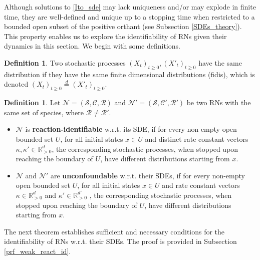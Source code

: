 \documentclass[10pt,a4paper]{amsart}
\theoremstyle{definition}
\newtheorem{definition}[theorem]{Definition}
\theoremstyle{remark}
\theoremstyle{consequence}
\def\k{\kappa}
\def\cN{\mathcal{N}}
\def\cR{\mathcal{R}}
\def\cS{\mathcal{S}}
\def\cC{\mathcal{C}}
\def\R{\mathbb{R}}
\numberwithin{equation}{section}
\begin{document}
Although solutions to \eqref{Ito_sde} may lack uniqueness and/or may explode in finite time, they are well-defined and unique up to a stopping time when restricted to a bounded open subset of the positive orthant (see Subsection \ref{SDEs_theory}).  This property enables us to explore the identifiability of RNs given their dynamics in this section. We begin with some definitions.
 \begin{definition}\label{def_fidis}
     Two stochastic processes $(X_t)_{t\geq0},({X}'_t)_{t\geq0}$ have the same distribution if they have the same finite dimensional distributions (fidis), which is denoted $(X_t)_{t\geq0}\overset{d}{=}({X}'_t)_{t\geq0}$.
 \end{definition}

\begin{definition}
Let $\cN = (\cS, \cC, \cR)$ and $\cN' = (\cS, \cC', \cR')$ be two RNs with the same set of species, where $\cR \neq \cR'$.
\begin{itemize}
  \item  $\cN$ is \textbf{reaction-identifiable} w.r.t. its SDE, if for every non-empty open bounded set $U$, for all initial states $x\in U$ and distinct rate constant vectors $\k, \k'\in\R_{>0}^d$, the corresponding stochastic processes, when stopped upon reaching the boundary of $U$, have different distributions starting from $x$.

  \item   $\cN$ and $\cN'$ are \textbf{unconfoundable} w.r.t. their SDEs, if for every non-empty open bounded set $U$, for all initial states $x\in U$ and rate constant vectors $\k\in \R_{>0}^d$ and $\k'\in \R_{>0}^{d'}$ , the corresponding stochastic processes, when stopped upon reaching the boundary of $U$, have different distributions starting from $x$.
\end{itemize}
    
 \end{definition}



The next theorem establishes sufficient and necessary conditions for the identifiability of RNs w.r.t. their SDEs.
 The proof is provided in Subsection \ref{prf_weak_react_id}.
\end{document}
